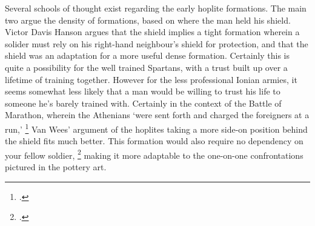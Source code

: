 \documentclass[twoside, a4paper, 12pt]{article}
\begin{document}
\par\vspace{1em}

Several schools of thought exist regarding the early hoplite formations. The
main two argue the density of formations, based on where the man held his shield.
Victor Davis Hanson argues that the shield implies a tight formation wherein
a solider must rely on his right-hand neighbour's shield for protection, and
that the shield was an adaptation for a more useful dense formation.\footnotemark
{}
Certainly this is quite a possibility for the well trained Spartans, with a
trust built up over a lifetime of training together. However for the less
professional Ionian armies, it seems somewhat less likely that a man would be
willing to trust his life to someone he's barely trained with. Certainly
in the context of the Battle of Marathon, wherein the Athenians
`were sent forth and charged the foreigners at a run,'
\footcite[Book 6.112]{herodotus_1920} Van Wees' argument of the hoplites taking
a more side-on position behind the shield fits much better.
This formation would also require no dependency on your
fellow soldier, \footcite[58]{wees_hoplite_bronze} making it more adaptable to
the one-on-one confrontations pictured in the pottery art.

\par\vspace{1em}
\end{document}
